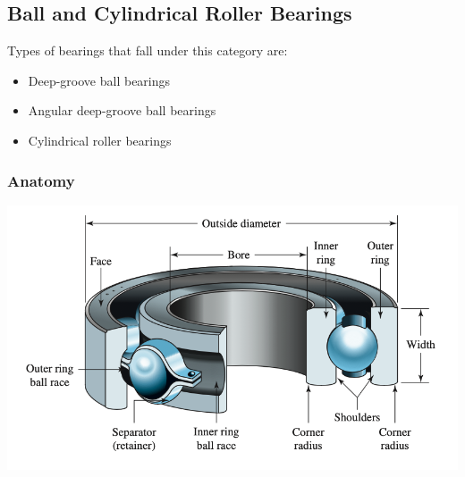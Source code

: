 \documentclass[11pt, fleqn]{article}
\begin{document}
\subsection{Ball and Cylindrical Roller Bearings} \label{bearingselection}
Types of bearings that fall under this category are:
\begin{itemize}
    \item Deep-groove ball bearings
    \item Angular deep-groove ball bearings
    \item Cylindrical roller bearings
\end{itemize}
\subsubsection{Anatomy}
\includegraphics[scale=0.75]{Bearings/ball-bearing.png}
\end{document}
